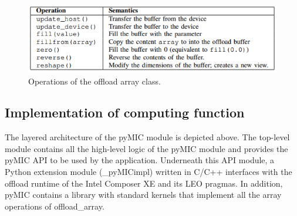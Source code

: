 \documentclass[12pt]{article}
\begin{document}
\begin{figure}[H]
\centering
\includegraphics[scale = 0.9]{chainer26.png}
\caption{Operations of the offload array class.}
\end{figure}

\subsection{Implementation of computing function}
The layered architecture of the pyMIC module is depicted above. The top-level module contains all the high-level logic of the pyMIC module and provides the pyMIC API to be used by the application. Underneath this API module, a Python extension module (\_pyMICimpl) written in C/C++ interfaces with the offload runtime of the Intel Composer XE and its LEO pragmas. In addition, pyMIC contains a library with standard kernels that implement all the array operations of offload\_array.
\end{document}
